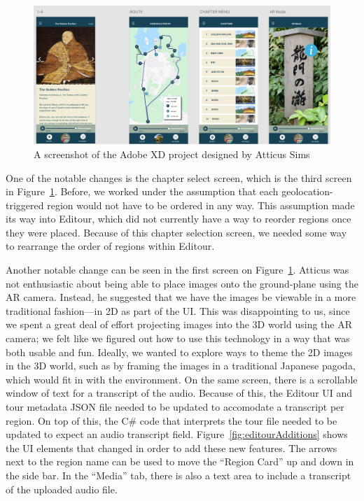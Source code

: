 \documentclass[a4paper, 10pt, american, titlepage]{article}
\begin{document}
\begin{figure}[h]
	\centering
	\includegraphics[width=1\textwidth]{adobe-xd-design.png}
	\caption[A screenshot of the Adobe XD project designed by Atticus Sims]
    {A screenshot of the Adobe XD project designed by Atticus Sims}
	\label{fig:adobeXdDesign}
\end{figure}

One of the notable changes is the chapter select screen, which is the third
screen in Figure~\ref{fig:adobeXdDesign}. Before, we worked under the assumption
that each geolocation-triggered region would not have to be ordered in any way.
This assumption made its way into Editour, which did not currently have a way
to reorder regions once they were placed. Because of this chapter selection
screen, we needed some way to rearrange the order of regions within Editour.

Another notable change can be seen in the first screen on
Figure~\ref{fig:adobeXdDesign}. Atticus was not enthusiastic about being able
to place images onto the ground-plane using the AR camera. Instead, he
suggested that we have the images be viewable in a more traditional
fashion---in 2D as part of the UI. This was disappointing to us, since we spent
a great deal of effort projecting images into the 3D world using the AR camera;
we felt like we figured out how to use this technology in a way that was both
usable and fun. Ideally, we wanted to explore ways to theme the 2D images in
the 3D world, such as by framing the images in a traditional Japanese pagoda,
which would fit in with the environment. On the same screen, there is a
scrollable window of text for a transcript of the audio. Because of this, the
Editour UI and tour metadata JSON file needed to be updated to accomodate a
transcript per region. On top of this, the C\# code that interprets the tour
file needed to be updated to expect an audio transcript field.
Figure~\ref{fig:editourAdditions} shows the UI elements that changed in order
to add these new features. The arrows next to the region name can be used to
move the ``Region Card'' up and down in the side bar. In the ``Media'' tab, there
is also a text area to include a transcript of the uploaded audio file. 
\end{document}
